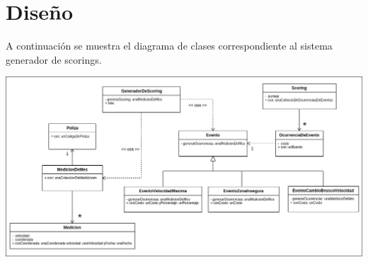 \section{Diseño}

A continuación se muestra el diagrama de clases correspondiente al sistema generador 
de scorings.

\centerline{\includegraphics[width=1\textwidth]{./imagenes/clases.png}}



